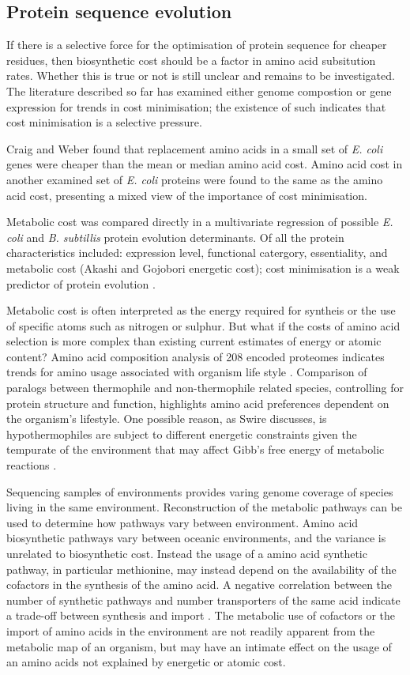 \subsection{Protein sequence evolution}

If there is a selective force for the optimisation of protein sequence for cheaper residues, then biosynthetic cost should be a factor in amino acid subsitution rates. Whether this is true or not is still unclear and remains to be investigated. The literature described so far has examined either genome compostion or gene expression for trends in cost minimisation; the existence of such indicates that cost minimisation is a selective pressure.

Craig and Weber \cite{craig1998} found that replacement amino acids in a small set of \emph{E. coli} genes were cheaper than the mean or median amino acid cost. Amino acid cost in another examined set of \emph{E. coli} proteins were found to the same as the amino acid cost, presenting a mixed view of the importance of cost minimisation.

Metabolic cost was compared directly in a multivariate regression of possible \emph{E. coli} and \emph{B. subtillis} protein evolution determinants. Of all the protein characteristics included: expression level, functional catergory, essentiality, and metabolic cost (Akashi and Gojobori energetic cost\cite{akashi2002}); cost minimisation is a weak predictor of protein evolution \cite{rocha2004}.

Metabolic cost is often interpreted as the energy required for syntheis or the use of specific atoms such as nitrogen or sulphur. But what if the costs of amino acid selection is more complex than existing current estimates of energy or atomic content? Amino acid composition analysis of 208 encoded proteomes indicates trends for amino usage associated with organism life style \cite{tekaia}. Comparison of paralogs between thermophile and non-thermophile related species, controlling for protein structure and function, highlights amino acid preferences dependent on the organism's lifestyle. One possible reason, as Swire discusses, is hypothermophiles are subject to different energetic constraints given the tempurate of the environment that may affect Gibb's free energy of metabolic reactions \cite{swire2006}.

Sequencing samples of environments provides varing genome coverage of species living in the same environment. Reconstruction of the metabolic pathways can be used to determine how pathways vary between environment. Amino acid biosynthetic pathways vary between oceanic environments, and the variance is unrelated to biosynthetic cost. Instead the usage of a amino acid synthetic pathway, in particular methionine, may instead depend on the availability of the cofactors in the synthesis of the amino acid. A negative correlation between the number of synthetic pathways and number transporters of the same acid indicate a trade-off between synthesis and import \cite{gianoulis2009}. The metabolic use of cofactors or the import of amino acids in the environment are not readily apparent from the metabolic map of an organism, but may have an intimate effect on the usage of an amino acids not explained by energetic or atomic cost.

